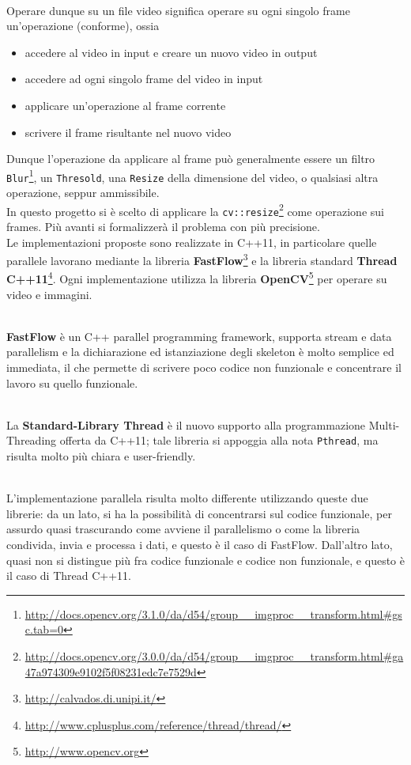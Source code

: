 \documentclass[12pt]{article}
\begin{document}
\\Operare dunque su un file video significa operare su ogni singolo frame un'operazione (conforme), ossia 
\begin{itemize}
\item accedere al video in input e creare un nuovo video in output
\item accedere ad ogni singolo frame del video in input
\item applicare un'operazione al frame corrente
\item scrivere il frame risultante nel nuovo video
\end{itemize}
Dunque l'operazione da applicare al frame pu\`o generalmente essere un filtro \texttt{Blur}\footnote{\url{http://docs.opencv.org/3.1.0/da/d54/group__imgproc__transform.html#gsc.tab=0}}, un \texttt{Thresold}, una \texttt{Resize} della dimensione del video, o qualsiasi altra operazione, seppur ammissibile.
\\In questo progetto si \`e scelto di applicare la \texttt{cv::resize}\footnote{\url{http://docs.opencv.org/3.0.0/da/d54/group__imgproc__transform.html#ga47a974309e9102f5f08231edc7e7529d}} come operazione sui frames. Pi\`u avanti si formalizzer\`a il problema con pi\`u precisione.
\\Le implementazioni proposte sono realizzate in C++11, in particolare quelle parallele lavorano mediante la libreria \textbf{FastFlow}\footnote{\url{http://calvados.di.unipi.it/}} e la libreria standard \textbf{Thread C++11}\footnote{\url{http://www.cplusplus.com/reference/thread/thread/}}. Ogni implementazione utilizza la libreria \textbf{OpenCV}\footnote{\url{http://www.opencv.org}} per operare su video e immagini.

\\ \textbf{FastFlow} \`e un C++ parallel programming framework, supporta stream e data parallelism e la dichiarazione ed istanziazione degli skeleton \`e molto semplice ed immediata, il che permette di scrivere poco codice non funzionale e concentrare il lavoro su quello funzionale. 

\\La \textbf{Standard-Library Thread} \`e il nuovo supporto alla programmazione Multi-Threading offerta da C++11; tale libreria si appoggia alla nota \texttt{Pthread}, ma risulta molto pi\`u chiara e user-friendly. 

\\L'implementazione parallela risulta molto differente utilizzando queste due librerie: da un lato, si ha la possibilit\`a di concentrarsi sul codice funzionale, per assurdo quasi trascurando come avviene il parallelismo o come la libreria condivida, invia e processa i dati, e questo \`e il caso di FastFlow. Dall'altro lato, quasi non si distingue pi\`u fra codice funzionale e codice non funzionale, e questo \`e il caso di Thread C++11.
\end{document}
